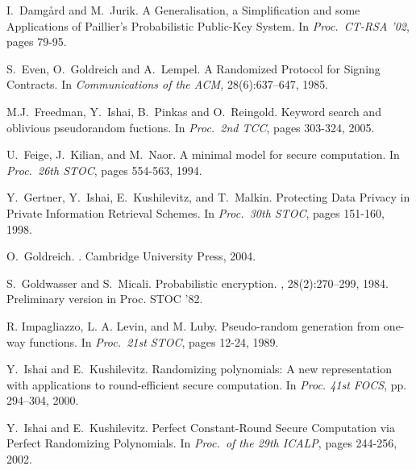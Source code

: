 \documentclass[11pt]{article}
\begin{document}
\begin{thebibliography}{10}
I.~Damg{\aa}rd and M.~Jurik.
\newblock A Generalisation, a Simplification and some Applications of Paillier's Probabilistic Public-Key
System.
\newblock In {\em Proc.\ CT-RSA '02}, pages 79-95.

S.~Even, O.~Goldreich and A.~Lempel.
\newblock A Randomized Protocol for Signing Contracts.
\newblock In {\em Communications of the ACM,} 28(6):637--647, 1985.


M.J.~Freedman, Y.~Ishai, B.~Pinkas and O.~Reingold.
\newblock Keyword search and oblivious pseudorandom fuctions.
\newblock In {\em Proc.\ 2nd TCC}, pages 303-324, 2005.

U.~Feige, J.~Kilian, and M.~Naor.
\newblock  A minimal model for secure computation.
\newblock  In {\em Proc.\ 26th STOC}, pages 554-563, 1994.

Y.~Gertner, Y.~Ishai, E.~Kushilevitz, and T.~Malkin.
\newblock Protecting Data Privacy in Private Information Retrieval Schemes.
\newblock In {\em Proc.\ 30th STOC}, pages 151-160, 1998.

O.~Goldreich.
.
\newblock Cambridge University Press, 2004.

S.~Goldwasser and S.~Micali.
\newblock Probabilistic encryption.
, 28(2):270--299, 1984.
\newblock Preliminary version in Proc. STOC '82.


R. Impagliazzo, L. A. Levin, and M. Luby.
\newblock Pseudo-random generation from one-way functions.
\newblock In {\em Proc.\ 21st STOC}, pages 12-24, 1989.


Y.~Ishai and E.~Kushilevitz.
\newblock Randomizing polynomials: A new representation with applications to
     round-efficient secure computation.
\newblock In {\em Proc. 41st FOCS}, pp. 294--304, 2000.

Y.~Ishai and E.~Kushilevitz.
\newblock Perfect Constant-Round Secure Computation via Perfect Randomizing Polynomials.
\newblock In {\em Proc.\ of the 29th ICALP}, pages 244-256, 2002.


\end{thebibliography}
\end{document}
